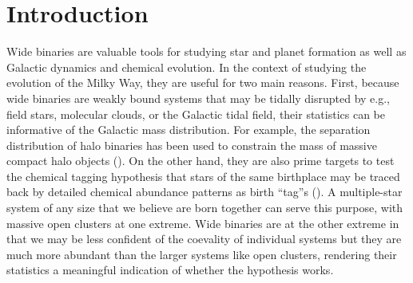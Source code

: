 \documentclass[manuscript]{aastex6}
\begin{document}
\section{Introduction} %
\label{sec:introduction}

Wide binaries are valuable tools for studying star and planet formation as well
as Galactic dynamics and chemical evolution.
In the context of studying the evolution of the Milky Way, they are useful for
two main reasons.
First, because wide binaries are weakly bound systems that may be tidally
disrupted by e.g., field stars, molecular clouds, or the Galactic tidal field,
their statistics can be informative of the Galactic mass distribution.
For example, the separation distribution of halo binaries has been
used to constrain the mass of massive compact halo objects (\citealt{Yoo:2004aa}).
On the other hand, they are also prime targets to test the chemical tagging
hypothesis that stars of the same birthplace may be traced back by detailed
chemical abundance patterns as birth ``tag''s (\citealt{2002ARA&A..40..487F}).
A multiple-star system of any size that we believe are born together can serve this purpose,
with massive open clusters at one extreme.
Wide binaries are at the other extreme in that we may be less confident of
the coevality of individual systems
but they are much more abundant than the larger systems like open clusters,
rendering their statistics a meaningful indication of whether the hypothesis works.
\end{document}
